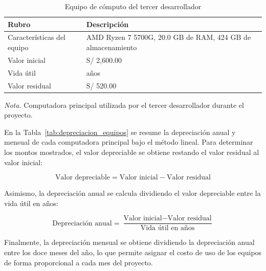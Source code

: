 \begin{table}[htbp]
\centering
\caption{Equipo de cómputo del tercer desarrollador}
\label{tab:equipo_dev3}
\begin{tabularx}{\textwidth}{@{}>{\raggedright\arraybackslash}p{4.2cm} >{\raggedright\arraybackslash}X@{}}
\toprule
\textbf{Rubro} & \textbf{Descripción} \\
\midrule
Características del equipo & AMD Ryzen 7 5700G, 20.0 GB de RAM, 424 GB de almacenamiento \\
Valor inicial & S/ 2,600.00 \\
Vida útil & 5 años \\
Valor residual & S/ 520.00 \\
\bottomrule
\end{tabularx}
\par\vspace{0.3em}
\raggedright\footnotesize{\textit{Nota.} Computadora principal utilizada por el tercer desarrollador durante el proyecto.}
\end{table}

\FloatBarrier

En la Tabla~\ref{tab:depreciacion_equipos} se resume la depreciación anual y mensual de cada computadora principal bajo el método lineal. Para determinar los montos mostrados, el valor depreciable se obtiene restando el valor residual al valor inicial:

\[
\text{Valor depreciable} = \text{Valor inicial} - \text{Valor residual}
\]

Asimismo, la depreciación anual se calcula dividiendo el valor depreciable entre la vida útil en años:

\[
\text{Depreciación anual} = \frac{\text{Valor inicial} - \text{Valor residual}}{\text{Vida útil en años}}
\]

Finalmente, la depreciación mensual se obtiene dividiendo la depreciación anual entre los doce meses del año, lo que permite asignar el costo de uso de los equipos de forma proporcional a cada mes del proyecto.


